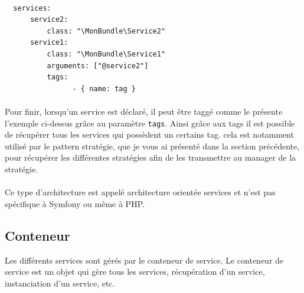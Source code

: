 \begin{verbatim}

  services:
      service2:
          class: "\MonBundle\Service2"
      service1:
          class: "\MonBundle\Service1"
          arguments: ["@service2"]
          tags:
                - { name: tag }

\end{verbatim}
\paragraph{}
Pour finir, lorsqu'un service est déclaré, il peut être taggé comme le présente l'exemple ci-dessus grâce au paramètre \verb?tags?.
Ainsi grâce aux tags il est possible de récupérer tous les services qui possèdent un certains tag. cela est notamment utilisé par le pattern stratégie, que je vous ai présenté dans la section précédente, pour récupérer les différentes stratégies afin de les transmettre au manager de la stratégie.
\paragraph{}
Ce type d'architecture est appelé \og architecture orientée services \fg{} et n'est pas spécifique à Symfony ou même à PHP.
\subsection{Conteneur}
Les différents services sont gérés par le conteneur de service. Le conteneur de service est un objet qui gère tous les services, récupération d'un service, instanciation d'un service, etc.
